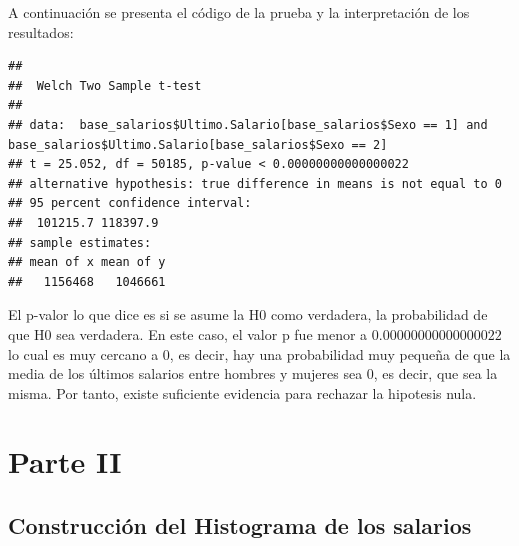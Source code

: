 \documentclass[
]{article}
\newenvironment{Shaded}{\begin{snugshade}}{\end{snugshade}}
\newcommand{\AttributeTok}[1]{\textcolor[rgb]{0.13,0.29,0.53}{#1}}
\newcommand{\ConstantTok}[1]{\textcolor[rgb]{0.56,0.35,0.01}{#1}}
\newcommand{\DecValTok}[1]{\textcolor[rgb]{0.00,0.00,0.81}{#1}}
\newcommand{\FloatTok}[1]{\textcolor[rgb]{0.00,0.00,0.81}{#1}}
\newcommand{\FunctionTok}[1]{\textcolor[rgb]{0.13,0.29,0.53}{\textbf{#1}}}
\newcommand{\NormalTok}[1]{#1}
\newcommand{\SpecialCharTok}[1]{\textcolor[rgb]{0.81,0.36,0.00}{\textbf{#1}}}
\newcommand{\StringTok}[1]{\textcolor[rgb]{0.31,0.60,0.02}{#1}}
\begin{document}
A continuación se presenta el código de la prueba y la interpretación de
los resultados:

\begin{Shaded}
\end{Shaded}

\begin{verbatim}
## 
##  Welch Two Sample t-test
## 
## data:  base_salarios$Ultimo.Salario[base_salarios$Sexo == 1] and base_salarios$Ultimo.Salario[base_salarios$Sexo == 2]
## t = 25.052, df = 50185, p-value < 0.00000000000000022
## alternative hypothesis: true difference in means is not equal to 0
## 95 percent confidence interval:
##  101215.7 118397.9
## sample estimates:
## mean of x mean of y 
##   1156468   1046661
\end{verbatim}

El p-valor lo que dice es si se asume la H0 como verdadera, la
probabilidad de que H0 sea verdadera. En este caso, el valor p fue menor
a \(0.00000000000000022\) lo cual es muy cercano a 0, es decir, hay una
probabilidad muy pequeña de que la media de los últimos salarios entre
hombres y mujeres sea 0, es decir, que sea la misma. Por tanto, existe
suficiente evidencia para rechazar la hipotesis nula.

\hypertarget{parte-ii}{%
\section{Parte II}\label{parte-ii}}

\hypertarget{construcciuxf3n-del-histograma-de-los-salarios}{%
\subsection{Construcción del Histograma de los
salarios}\label{construcciuxf3n-del-histograma-de-los-salarios}}
\end{document}
